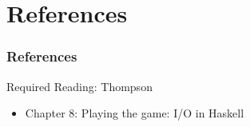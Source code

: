 \documentclass[dvipsnames]{beamer}
\theoremstyle{plain}
\begin{document}
\section*{References}

\begin{frame}
  \frametitle{References}

  \begin{block}{Required Reading: Thompson}
    \begin{itemize}
      \item Chapter 8: \alert{Playing the game: I/O in Haskell}
    \end{itemize}
  \end{block}
\end{frame}
\end{document}
